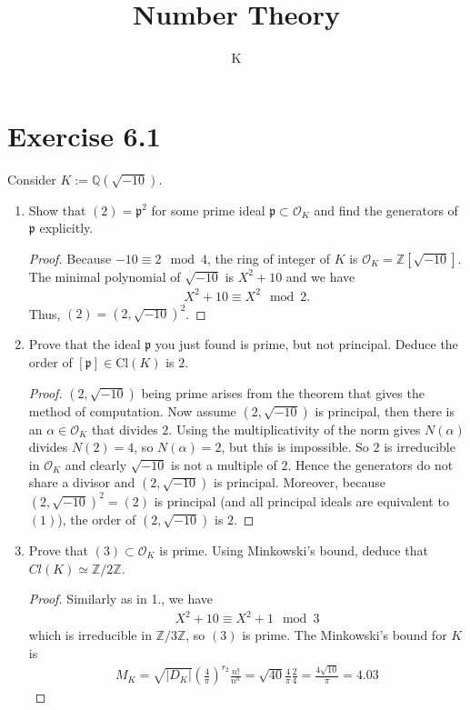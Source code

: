 \documentclass[a4paper]{article}
\title{Number Theory}
\author{K}
\begin{document}
\section*{Exercise 6.1}
Consider \(K := \mathbb{Q}(\sqrt{-10})\).
\begin{enumerate}
    \item Show that \((2) = \mathfrak{p}^2\) for some prime ideal \(\mathfrak{p} \subset \mathcal{O}_K\) and find the generators of \(\mathfrak{p}\) explicitly.
    \begin{proof}
        Because \(-10 \equiv 2 \mod{4}\), the ring of integer of \(K\) is \(\mathcal{O}_K = \mathbb{Z}[\sqrt{-10}]\). The minimal polynomial of \(\sqrt{-10}\) is \(X^2 + 10\) and we have
        \begin{align*}
            X^2 + 10 \equiv X^2 \mod{2} \text{.}
        \end{align*}
        Thus, \((2) = (2, \sqrt{-10})^2\).
    \end{proof}
    \item Prove that the ideal \(\mathfrak{p}\) you just found is prime, but not principal. Deduce the order of \([\mathfrak{p}] \in \mathrm{Cl}(K)\) is \(2\).
    \begin{proof}
        \((2, \sqrt{-10})\) being prime arises from the theorem that gives the method of computation. Now assume \((2, \sqrt{-10})\) is principal, then there is an \(\alpha \in \mathcal{O}_K\) that divides \(2\). Using the multiplicativity of the norm gives \(N(\alpha)\) divides \(N(2) = 4\), so \(N(\alpha) = 2\), but this is impossible. So \(2\) is irreducible in \(\mathcal{O}_K\) and clearly \(\sqrt{-10}\) is not a multiple of \(2\). Hence the generators do not share a divisor and \((2, \sqrt{-10})\) is principal. Moreover, because \((2, \sqrt{-10})^2 = (2)\) is principal (and all principal ideals are equivalent to \((1)\)), the order of \((2, \sqrt{-10})\) is \(2\).
    \end{proof}
        \item Prove that \((3) \subset \mathcal{O}_K\) is prime. Using Minkowski's bound, deduce that \(Cl(K) \simeq \mathbb{Z}/2\mathbb{Z}\).
        \begin{proof}
            Similarly as in 1., we have
            \begin{align*}
                X^2 + 10 \equiv X^2 + 1 \mod{3}
            \end{align*}
            which is irreducible in \(\mathbb{Z}/3\mathbb{Z}\), so \((3)\) is prime. The Minkowski's bound for \(K\) is
            \begin{align*}
                M_K = \sqrt{|D_K|} \left(\frac{4}{\pi}\right)^{r_2} \frac{n!}{n^n} = \sqrt{40} \frac{4}{\pi} \frac{2}{4} = \frac{4 \sqrt{10}}{\pi} = 4.03
            \end{align*}
        \end{proof}
\end{enumerate}
\end{document}
